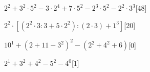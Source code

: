 \begin{esercizio} %
\(2^2+3^2\cdot5^2-3\cdot2^4+7\cdot5^2-2^3\cdot5^2-2^2\cdot3^3\)\hfill[48]
\end{esercizio}
\begin{esercizio} %
\(2^2\cdot[(2^2\cdot3:3+5\cdot2^2):(2\cdot3)+1^3]\)\hfill[20]
\end{esercizio}
\begin{esercizio} %
\(10^1+(2+11-3^2)^2-(2^2+4^2+6)\)\hfill[0]
\end{esercizio}
\begin{esercizio} %
\(2^1+3^2+4^2-5^2-4^0\)\hfill[1]
\end{esercizio}
